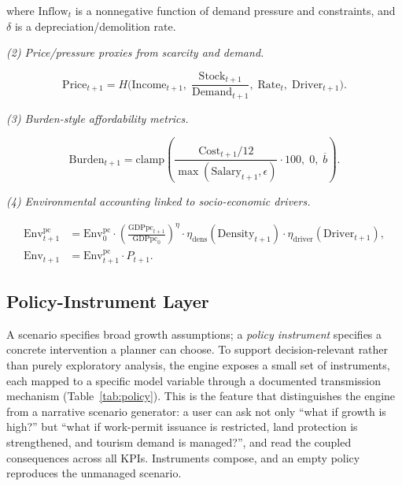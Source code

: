 \documentclass[urbansci,article,submit,pdftex,moreauthors]{Definitions/mdpi}
\begin{document}
where $\mathrm{Inflow}_t$ is a nonnegative function of demand pressure and
constraints, and $\delta$ is a depreciation/demolition rate.

\textit{(2) Price/pressure proxies from scarcity and demand.}

\begin{linenomath}
\begin{equation}
\mathrm{Price}_{t+1} = H\Big(\mathrm{Income}_{t+1},\;
                               \frac{\mathrm{Stock}_{t+1}}{\mathrm{Demand}_{t+1}},\;
                               \mathrm{Rate}_t,\;
                               \mathrm{Driver}_{t+1}\Big).
\end{equation}
\end{linenomath}

\textit{(3) Burden-style affordability metrics.}

\begin{linenomath}
\begin{equation}
\mathrm{Burden}_{t+1}=\mathrm{clamp}\left(
    \frac{\mathrm{Cost}_{t+1}/12}{\max(\mathrm{Salary}_{t+1},\epsilon)}
    \cdot 100,\; 0,\; \overline{b}\right).
\end{equation}
\end{linenomath}

\textit{(4) Environmental accounting linked to socio-economic drivers.}

\begin{linenomath}
\begin{align}
\mathrm{Env}^\mathrm{pc}_{t+1}
    &=\mathrm{Env}^\mathrm{pc}_0
     \cdot \left(\frac{\mathrm{GDPpc}_{t+1}}{\mathrm{GDPpc}_0}\right)^{\eta}
     \cdot \eta_\mathrm{dens}(\mathrm{Density}_{t+1})
     \cdot \eta_\mathrm{driver}(\mathrm{Driver}_{t+1}),\\
\mathrm{Env}_{t+1}
    &=\mathrm{Env}^\mathrm{pc}_{t+1}\cdot P_{t+1}.
\end{align}
\end{linenomath}

\subsection{Policy-Instrument Layer}
\label{subsec:policy_layer}

A scenario specifies broad growth assumptions; a \emph{policy instrument} specifies
a concrete intervention a planner can choose. To support decision-relevant rather
than purely exploratory analysis, the engine exposes a small set of instruments,
each mapped to a specific model variable through a documented transmission
mechanism (Table~\ref{tab:policy}). This is the feature that distinguishes the
engine from a narrative scenario generator: a user can ask not only ``what if growth
is high?'' but ``what if work-permit issuance is restricted, land protection is
strengthened, and tourism demand is managed?'', and read the coupled consequences
across all KPIs. Instruments compose, and an empty policy reproduces the unmanaged
scenario.
\end{document}
